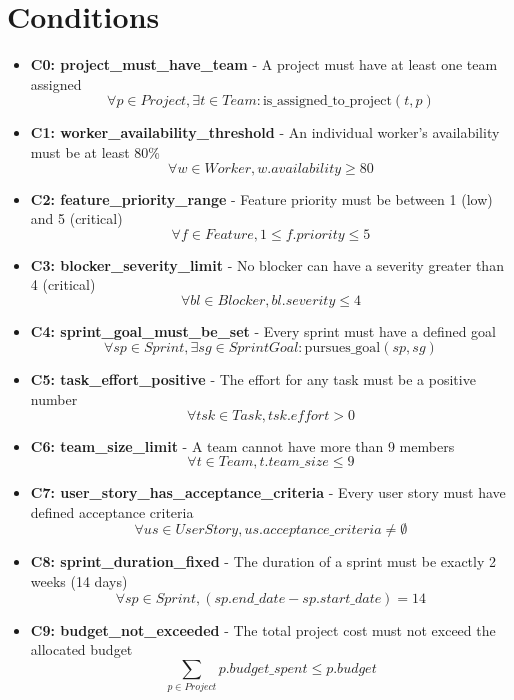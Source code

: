\documentclass{article}
\begin{document}
\section{Conditions}
\begin{itemize}
    \item \textbf{C0: project\_must\_have\_team} - A project must have at least one team assigned
        \[ \forall p \in Project, \exists t \in Team : \text{is\_assigned\_to\_project}(t, p) \]
    \item \textbf{C1: worker\_availability\_threshold} - An individual worker's availability must be at least 80\%
        \[ \forall w \in Worker, w.availability \geq 80 \]
    \item \textbf{C2: feature\_priority\_range} - Feature priority must be between 1 (low) and 5 (critical)
        \[ \forall f \in Feature, 1 \leq f.priority \leq 5 \]
    \item \textbf{C3: blocker\_severity\_limit} - No blocker can have a severity greater than 4 (critical)
        \[ \forall bl \in Blocker, bl.severity \leq 4 \]
    \item \textbf{C4: sprint\_goal\_must\_be\_set} - Every sprint must have a defined goal
        \[ \forall sp \in Sprint, \exists sg \in SprintGoal : \text{pursues\_goal}(sp, sg) \]
    \item \textbf{C5: task\_effort\_positive} - The effort for any task must be a positive number
        \[ \forall tsk \in Task, tsk.effort > 0 \]
    \item \textbf{C6: team\_size\_limit} - A team cannot have more than 9 members
        \[ \forall t \in Team, t.team\_size \leq 9 \]
    \item \textbf{C7: user\_story\_has\_acceptance\_criteria} - Every user story must have defined acceptance criteria
        \[ \forall us \in UserStory, us.acceptance\_criteria \neq \emptyset \]
    \item \textbf{C8: sprint\_duration\_fixed} - The duration of a sprint must be exactly 2 weeks (14 days)
        \[ \forall sp \in Sprint, (sp.end\_date - sp.start\_date) = 14 \]
    \item \textbf{C9: budget\_not\_exceeded} - The total project cost must not exceed the allocated budget
        \[ \sum_{p \in Project} p.budget\_spent \leq p.budget \]
\end{itemize}
\end{document}
